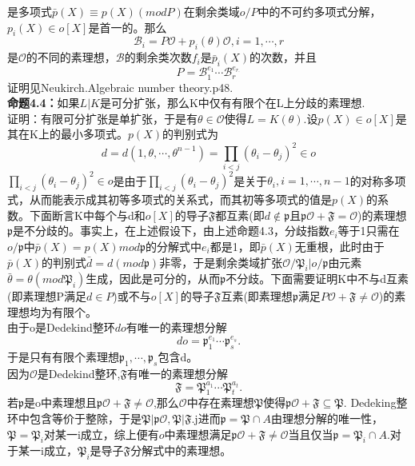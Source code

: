 \documentclass[UTF8]{article}
\begin{document}
    是多项式$\bar{p}(X)\equiv p(X)(modP)$在剩余类域$o/P$中的不可约多项式分解，$p_{i}(X)\in o[X]$是首一的。那么$$
  \mathcal{B}_{i}=P\mathcal{O}+p_{i}(\theta)\mathcal{O},i=1,\cdots,r
  $$是$\mathcal{O}$的不同的素理想，$\mathcal{B}$的剩余类次数$f_{i}$是$\bar{p}_{i}(X)$的次数，并且$$
 P=\mathcal{B}_{1}^{e_{1}}\cdots\mathcal{B}_{r}^{e_{r.}}
  $$
 证明见Neukirch.Algebraic number theory.p48.\\
 \textbf{命题4.4：}如果$L|K$是可分扩张，那么K中仅有有限个在L上分歧的素理想.\\
 证明：有限可分扩张是单扩张，于是有$\theta\in \mathcal{O}$使得$L=K(\theta).$设$p(X)\in o[X]$是其在K上的最小多项式。$p(X)$的判别式为
 $$
 d=d(1,\theta,\cdots,\theta^{n-1})=\prod_{i<j}(\theta_{i}-\theta_{j})^{2}\in o
 $$
 $\prod_{i<j}(\theta_{i}-\theta_{j})^{2}\in o$是由于$\prod_{i<j}(\theta_{i}-\theta_{j})^{2}$是关于$\theta_{i},i=1,\cdots,n-1$的对称多项式，从而能表示成其初等多项式的关系式，而其初等多项式的值是$p(X)$的系数。下面断言K中每个与d和$o[X]$的导子$\mathfrak{F}$都互素(即$d\notin \mathfrak{p}$且$\mathfrak{p}\mathcal{O}+\mathfrak{F}=\mathcal{O}$)的素理想
 $\mathfrak{p}$是不分歧的。事实上，在上述假设下，由上述命题4.3，分歧指数$e_{i}$等于1只需在
 $o/\mathfrak{p}$中$\bar{p}(X)=p(X)mod\mathfrak{p}$的分解式中$e_{i}$都是1，即$\bar{p}(X)$无重根，此时由于$\bar{p}(X)$的判别式$\bar{d}=d(mod \mathfrak{p})$非零，于是剩余类域扩张$\mathcal{O}/\mathfrak{P}_{i}|o/\mathfrak{p}$由元素$\bar{\theta}=\theta(mod\mathfrak{P}_{i})$生成，因此是可分的，从而$\mathfrak{p}$不分歧。下面需要证明K中不与d互素(即素理想P满足$d\in P$)或不与$o[X]$的导子$\mathfrak{F}$互素(即素理想$\mathfrak{p}$满足$P\mathcal{O}+\mathfrak{F}\neq\mathcal{O}$)的素理想均为有限个。\\
 由于o是Dedekind整环$do$有唯一的素理想分解$$
 do=\mathfrak{p}_{1}^{e_{1}}\cdots\mathfrak{p}_{s}^{e_{s}}.
 $$
 于是只有有限个素理想$\mathfrak{p}_{1},\cdots,\mathfrak{p}_{s}$包含d。\\
 因为$\mathcal{O}$是Dedekind整环,$\mathfrak{F}$有唯一的素理想分解
 $$\mathfrak{F}=\mathfrak{P}_{1}^{a_{1}}\cdots\mathfrak{P}_{t}^{a_{t}}.
 $$
 若$\mathfrak{p}$是o中素理想且$\mathfrak{p}\mathcal{O}+\mathfrak{F}\neq \mathcal{O}$,那么$\mathcal{O}$中存在素理想$\mathfrak{P}$使得$\mathfrak{p}\mathcal{O}+\mathfrak{F}\subseteq \mathfrak{P}.$
 Dedeking整环中包含等价于整除，于是$\mathfrak{P}|\mathfrak{p}\mathcal{O},\mathfrak{P}|\mathfrak{F}.$j进而$\mathfrak{p}=\mathfrak{P}\cap A$由理想分解的唯一性，
 $\mathfrak{P}=\mathfrak{P}_{i}$对某一i成立，综上便有$o$中素理想满足$\mathfrak{p}\mathcal{O}+\mathfrak{F}\neq \mathcal{O}$当且仅当$\mathfrak{p}=\mathfrak{P}_{i}\cap A.$对于某一i成立，$\mathfrak{P}_{i}$是导子$\mathfrak{F}$分解式中的素理想。\\
\end{document}
